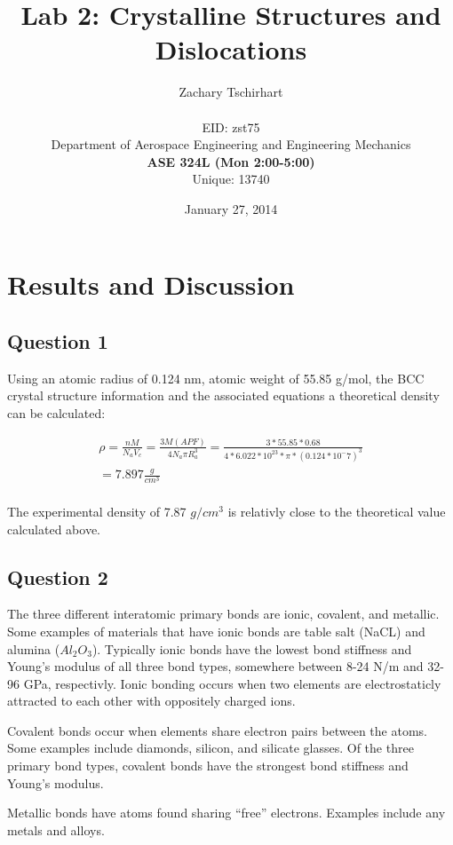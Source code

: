 \documentclass[12pt]{report}
\title{Lab 2: Crystalline Structures and Dislocations}
\author{Zachary Tschirhart \\
	\small \\
        \small EID: zst75 \\
	\small Department of Aerospace Engineering and Engineering Mechanics \\
	\small \textbf{ASE 324L (Mon 2:00-5:00)} \\
	\small Unique: 13740}
\date{January 27, 2014}
\begin{document}
\maketitle

\setcounter{secnumdepth}{0}

\section{Results and Discussion}
\doublespacing

\subsection{Question 1}

Using an atomic radius of 0.124 nm, atomic weight of 55.85 g/mol, the BCC crystal structure information and the associated equations a theoretical density can be calculated:

\begin{equation}
\begin{split}
	\rho = \frac{nM}{N_a V_c} = \frac{3M (APF)}{4N_a \pi R_a^3} 
        = \frac{3 * 55.85 * 0.68}{4 * 6.022*10^{23} * \pi * (0.124*10^-7)^3} \\
        = 7.897 \frac{g}{cm^3}
	\label{equation:equation1}
\end{split}
\end{equation}
\\
The experimental density of 7.87 \(g/cm^3\) is relativly close to the theoretical value calculated above.


\subsection{Question 2}
The three different interatomic primary bonds are ionic, covalent, and metallic. Some examples of materials that have ionic bonds are table salt (NaCL) and alumina (\(Al_2O_3\)). Typically ionic bonds have the lowest bond stiffness and Young's modulus of all three bond types, somewhere between 8-24 N/m and 32-96 GPa, respectivly. Ionic bonding occurs when two elements are electrostaticly attracted to each other with oppositely charged ions.

Covalent bonds occur when elements share electron pairs between the atoms. Some examples include diamonds, silicon, and silicate glasses. Of the three primary bond types, covalent bonds have the strongest bond stiffness and Young's modulus.

Metallic bonds have atoms found sharing ``free'' electrons. Examples include any metals and alloys.
\end{document}
